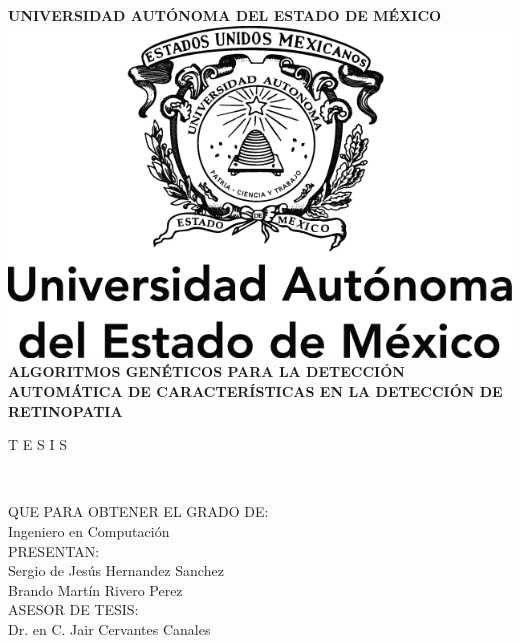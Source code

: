 \documentclass[letter,openright,12pt]{book}
\begin{document}
\begin{titlepage}
\begin{center}
\textbf{UNIVERSIDAD AUTÓNOMA DEL ESTADO DE MÉXICO}
\bigskip
\bigskip
\bigskip
\bigskip
\bigskip
\\
\includegraphics[scale=1]{ESCUDO/ESCUDO.png} 
\bigskip
\bigskip
\bigskip
\bigskip
\bigskip
\bigskip
\\  
\textbf{ALGORITMOS GENÉTICOS PARA LA DETECCIÓN AUTOMÁTICA DE CARACTERÍSTICAS EN LA DETECCIÓN DE RETINOPATIA}
\bigskip
\bigskip
\bigskip
\bigskip
\bigskip
\bigskip
\bigskip
\bigskip
\bigskip
\bigskip
\bigskip
\bigskip
\\
\begin{huge}
T E S I S
\end{huge}
\\
\bigskip
\bigskip
\bigskip
\begin{center}
QUE PARA OBTENER EL GRADO DE:\\
\medskip 
Ingeniero en Computación \\

\bigskip
\bigskip
PRESENTAN:\\
\medskip 
Sergio de Jesús Hernandez Sanchez\\
\medskip 
Brando Martín Rivero Perez\\
\bigskip
\bigskip
ASESOR DE TESIS:\\
\medskip 
Dr. en C. Jair Cervantes Canales\\
\end{center}

\end{center}
\end{titlepage}

\newpage
$\ $
\thispagestyle{empty}
\newpage
\end{document}
